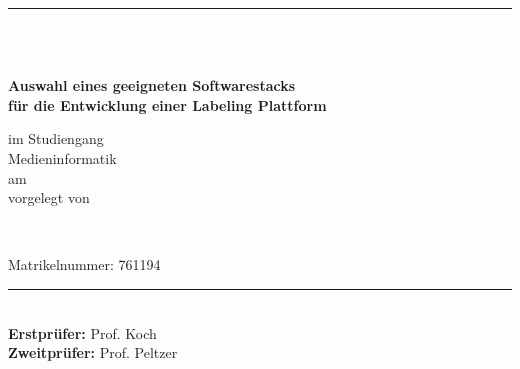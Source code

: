 \newcommand{\HRule}[2]{\noindent\rule[#1]{\linewidth}{#2}}
\newcommand{\vlinespace}[1]{\vspace*{#1\baselineskip}}
\newcommand{\titleemph}[1]{\textbf{#1}}
\begin{titlepage}
    \sffamily
    \hfill
    \HRule{13pt}{1pt}
    \centering
    \vlinespace{5}\\
    \workTyp\\
    \begin{Large}
        \textbf{Auswahl eines geeigneten Softwarestacks }\\
        \textbf{für die Entwicklung einer Labeling Plattform}\\
    \end{Large}
    \vlinespace{4}
    im Studiengang\\
    Medieninformatik\\
    am \workDatum\\
    \vlinespace{4}
    vorgelegt von\\
    \begin{Large}
        \textbf{\workNameStudent}\\
    \end{Large}
    \vlinespace{1}
    Matrikelnummer: 761194
    \vfill
    \raggedright{}
    \HRule{13pt}{1pt} \\
    \titleemph{Erstprüfer:} Prof. Koch\\
    \titleemph{Zweitprüfer:} Prof. Peltzer
\end{titlepage}